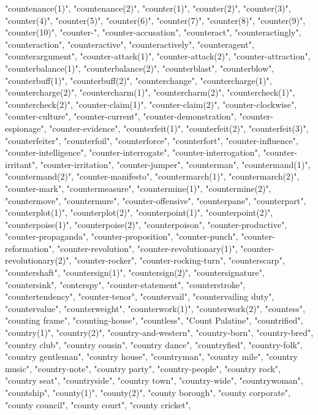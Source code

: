 "countenance(1)",
"countenance(2)",
"counter(1)",
"counter(2)",
"counter(3)",
"counter(4)",
"counter(5)",
"counter(6)",
"counter(7)",
"counter(8)",
"counter(9)",
"counter(10)",
"counter-",
"counter-accusation",
"counteract",
"counteractingly",
"counteraction",
"counteractive",
"counteractively",
"counteragent",
"counterargument",
"counter-attack(1)",
"counter-attack(2)",
"counter-attraction",
"counterbalance(1)",
"counterbalance(2)",
"counterblast",
"counterblow",
"counterbuff(1)",
"counterbuff(2)",
"counterchange",
"countercharge(1)",
"countercharge(2)",
"countercharm(1)",
"countercharm(2)",
"countercheck(1)",
"countercheck(2)",
"counter-claim(1)",
"counter-claim(2)",
"counter-clockwise",
"counter-culture",
"counter-current",
"counter-demonstration",
"counter-espionage",
"counter-evidence",
"counterfeit(1)",
"counterfeit(2)",
"counterfeit(3)",
"counterfeiter",
"counterfoil",
"counterforce",
"counterfort",
"counter-influence",
"counter-intelligence",
"counter-interrogate",
"counter-interrogation",
"counter-irritant",
"counter-irritation",
"counter-jumper",
"counterman",
"countermand(1)",
"countermand(2)",
"counter-manifesto",
"countermarch(1)",
"countermarch(2)",
"counter-mark",
"countermeasure",
"countermine(1)",
"countermine(2)",
"countermove",
"countermure",
"counter-offensive",
"counterpane",
"counterpart",
"counterplot(1)",
"counterplot(2)",
"counterpoint(1)",
"counterpoint(2)",
"counterpoise(1)",
"counterpoise(2)",
"counterpoison",
"counter-productive",
"counter-propaganda",
"counter-proposition",
"counter-punch",
"counter-reformation",
"counter-revolution",
"counter-revolutionary(1)",
"counter-revolutionary(2)",
"counter-rocker",
"counter-rocking-turn",
"counterscarp",
"countershaft",
"countersign(1)",
"countersign(2)",
"countersignature",
"countersink",
"conterspy",
"counter-statement",
"counterstroke",
"countertendency",
"counter-tenor",
"countervail",
"countervailing duty",
"countervalue",
"counterweight",
"counterwork(1)",
"counterwork(2)",
"countess",
"counting frame",
"counting-house",
"countless",
"Count Palatine",
"countrified",
"country(1)",
"country(2)",
"country-and-western",
"country-born",
"country-bred",
"country club",
"country cousin",
"country dance",
"countryfied",
"country-folk",
"country gentleman",
"country house",
"countryman",
"country mile",
"country music",
"country-note",
"country party",
"country-people",
"country rock",
"country seat",
"countryside",
"country town",
"country-wide",
"countrywoman",
"countship",
"county(1)",
"county(2)",
"county borough",
"county corporate",
"county council",
"county court",
"county cricket",
